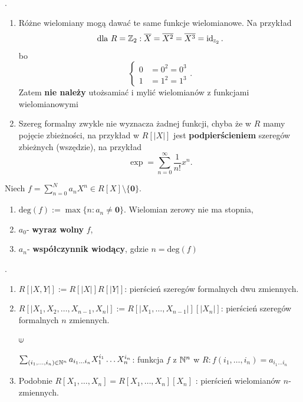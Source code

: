 \begin{remark}
	.

	\begin{enumerate}[label=\arabic*)]
		\item Różne wielomiany mogą dawać te same funkcje wielomianowe. Na przykład
			\[
			\text{dla } R = \mathbb{Z} _{2}: \overline{X}= \overline{X^2} = \overline{X^3} = \operatorname{id}_{\scriptscriptstyle \mathbb{Z}_{2}}
			.\] 
			bo
			\[
			\begin{cases}
				0 &= 0^2 = 0^3 \\
				1 &= 1^2 = 1^3
			\end{cases}
			.\] 
			Zatem \textbf{nie należy} utożsamiać i mylić wielomianów z funkcjami wielomianowymi
		\item Szereg formalny zwykle nie wyznacza żadnej funkcji, chyba że w $R$ mamy pojęcie zbieżności, na przykład w $R\left[ \left| X \right|  \right] $ jest \textbf{podpierścieniem} szeregów zbieżnych (wszędzie), na przykład 
			\[
			\exp = \sum_{n=0}^{\infty} \frac{1}{n!}x^{n}
			.\] 
	\end{enumerate}
\end{remark} 
\begin{definition}
	Niech $f = \sum_{n=0}^{N} a_{n} X^{n}\in R\left[ X \right] \setminus \{\mathbf{0}\} $.
	\begin{enumerate}[label=\arabic*)]
		\item $\text{deg}\left( f \right):= \max \{n: a_{n} \neq \mathbf{0}\}.$ Wielomian zerowy nie ma stopnia,
		\item $a_0$- \textbf{wyraz wolny} $f$,
		\item $a_{n}$- \textbf{współczynnik wiodący}, gdzie $n = \text{deg}\left( f \right) $
	\end{enumerate}
\end{definition} 
\begin{definition}
	.
	\begin{enumerate}[label=\arabic*)]
		\item $R\left[ \left| X,Y \right|  \right] := R\left[ \left| X \right|  \right] R\left[ \left| Y \right|  \right] $: pierścień szeregów formalnych dwu zmiennych.
		\item $R\left[ \left| X_1,X_2,\ldots, X_{n-1},X_{n}  \right|  \right] := R\left[ \left| X_1,\ldots,X_{n-1} \right|  \right] \left[ \left| X_{n}  \right|  \right] $: pierścień szeregów formalnych $n$ zmiennych.

			$\rotatein$

			 $\sum_{(i_1,\ldots,i_{n})\in \mathbb{N}^{n}} a_{i_1 \ldots i_{n}}X_1^{i_1}\ldots X_{n}^{i_{n}}$: funkcja $f$ z $\mathbb{N}^{n}$ w $R: f\left( i_1,\ldots,i_{n} \right) = a_{i_1\ldots i_{n}}$
		 \item Podobnie $R\left[ X_1,\ldots,X_{n}  \right] = R\left[  X_1,\ldots,X_{n} \right]\left[ X_{n} \right]  $ : pierścień wielomianów $n$-zmiennych.
	\end{enumerate}
\end{definition} 

